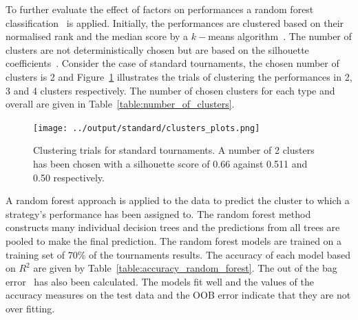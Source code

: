 \documentclass{article}
\begin{document}
To further evaluate the effect of factors on performances a random forest
classification~\cite{breiman2001} is applied. Initially, the performances are
clustered based on their normalised rank and the median score by a \(k-\)means
algorithm~\cite{Arthur2007}. The number of clusters are not deterministically
chosen but are based on the silhouette coefficients~\cite{Rousseeuw1987}.
Consider the case of standard tournaments, the chosen number of clusters is
2 and Figure~\ref{fig:standard_clusters} illustrates the trials of clustering the
performances in 2, 3 and 4 clusters respectively. The number of chosen clusters
for each type and overall are given in Table~\ref{table:number_of_clusters}.

\begin{figure}[!htbp]
\centering
\texttt{[image: ../output/standard/clusters\_plots.png]}
\caption{Clustering trials for standard tournaments. A number of 2 clusters has
been chosen with a silhouette score of  0.66 against 0.511 and 0.50
respectively.}\label{fig:standard_clusters}
\end{figure}

\begin{table}[!htbp]
    \begin{center}
    \end{center}
    \caption{Number of clusters for each type and overall and the respective silhouette coefficients.}
    \label{table:number_of_clusters}
\end{table}

A random forest approach is applied to the data to predict the cluster to which
a strategy's performance has been assigned to. The random forest method
constructs many individual decision trees and the predictions from all trees are
pooled to make the final prediction. The random forest models are trained on a
training set of 70\% of the tournaments results. The accuracy of each model
based on $R^2$ are given by Table~\ref{table:accuracy_random_forest}. The out of
the bag error~\cite{hastie2005} has also been calculated. The models fit well and
the values of the accuracy measures on the test data and the OOB error indicate that they are not
over fitting.
\end{document}
